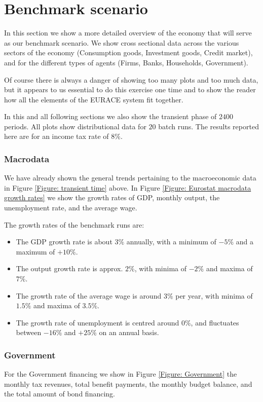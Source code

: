 \section{Benchmark scenario}
In this section we show a more detailed overview of the economy that will serve as our benchmark scenario.
We show cross sectional data across the various sectors of the economy (Consumption goods, Investment goods, Credit market),
and for the different types of agents (Firms, Banks, Households, Government). 

Of course there is always a danger of showing too many plots and too much data,
but it appears to us essential to do this exercise one time and to show the reader how
all the elements of the EURACE system fit together.

In this and all following sections we also show the transient phase of $2400$ periods.
All plots show distributional data for $20$ batch runs. The results reported here are for an income tax rate of $8\%$.

\subsubsection*{Macrodata}
We have already shown the general trends pertaining to the macroeconomic data in Figure \ref{Figure: transient time} above. 
In Figure \ref{Figure: Eurostat macrodata growth rates} we show the growth rates of GDP, monthly output, the unemployment rate, and the average wage.

The growth rates of the benchmark runs are:
\begin{itemize}
\item The GDP growth rate is about $3\%$ annually, with a minimum of $-5\%$ and a maximum of $+10\%$.
\item The output growth rate is approx. $2\%$, with minima of $-2\%$ and maxima of $7\%$.
\item The growth rate of the average wage is around $3\%$ per year, with minima of $1.5\%$ and maxima of $3.5\%$.
\item The growth rate of unemployment is centred around $0\%$, and fluctuates between $-16\%$ and $+25\%$ on an annual basis.
\end{itemize}

\subsubsection*{Government}
For the Government financing we show in Figure \ref{Figure: Government} the monthly tax revenues, total benefit payments, the monthly budget balance,
and the total amount of bond financing.


